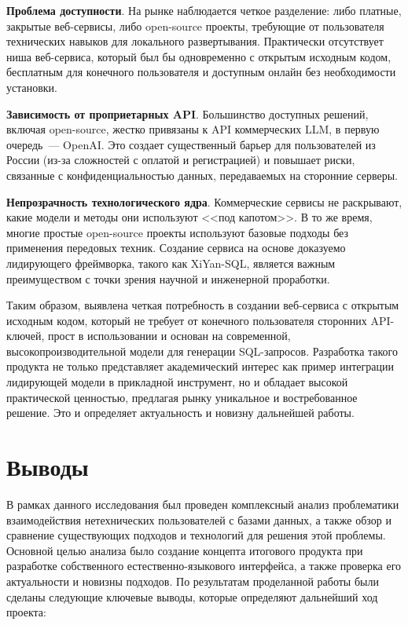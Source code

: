 \begin{compactitem}
      \item \textbf{Проблема доступности}. На рынке наблюдается четкое разделение:
      либо платные, закрытые веб-сервисы, либо open-source проекты,
      требующие от пользователя технических навыков для локального развертывания.
      Практически отсутствует ниша веб-сервиса, который был бы одновременно
      с открытым исходным кодом, бесплатным для конечного пользователя и доступным онлайн
      без необходимости установки.
      \item \textbf{Зависимость от проприетарных API}. Большинство доступных решений,
      включая open-source, жестко привязаны к API коммерческих LLM, в первую очередь~--- OpenAI.
      Это создает существенный барьер для пользователей из России
      (из-за сложностей с оплатой и регистрацией) и повышает риски,
      связанные с конфиденциальностью данных, передаваемых на сторонние серверы.
      \item \textbf{Непрозрачность технологического ядра}. Коммерческие сервисы не раскрывают,
      какие модели и методы они используют <<под капотом>>. В то же время,
      многие простые open-source проекты используют базовые подходы без применения передовых техник.
      Создание сервиса на основе доказуемо лидирующего фреймворка, такого как XiYan-SQL,
      является важным преимуществом с точки зрения научной и инженерной проработки.
\end{compactitem}

Таким образом, выявлена четкая потребность в создании веб-сервиса с открытым исходным кодом,
который не требует от конечного пользователя сторонних API-ключей,
прост в использовании и основан на современной, высокопроизводительной модели для
генерации SQL-запросов. Разработка такого продукта не только представляет
академический интерес как пример интеграции лидирующей модели в прикладной инструмент,
но и обладает высокой практической ценностью, предлагая рынку уникальное и востребованное решение.
Это и определяет актуальность и новизну дальнейшей работы.




\section{Выводы}

В рамках данного исследования был проведен комплексный анализ проблематики
взаимодействия нетехнических пользователей с базами данных,
а также обзор и сравнение существующих подходов и технологий для решения этой проблемы.
Основной целью анализа было создание концепта итогового продукта при
разработке собственного естественно-языкового интерфейса, а также проверка его актуальности и
новизны подходов.
По результатам проделанной работы
были сделаны следующие ключевые выводы, которые определяют дальнейший ход проекта:

